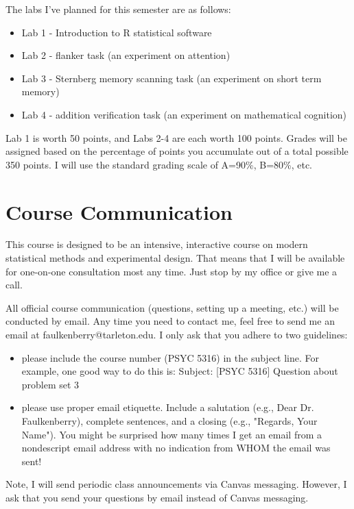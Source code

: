 \documentclass[10pt]{article}
\begin{document}
The labs I've planned for this semester are as follows:

\begin{itemize}
\item Lab 1 - Introduction to R statistical software
\item Lab 2 - flanker task (an experiment on attention)
\item Lab 3 - Sternberg memory scanning task (an experiment on short term memory)
\item Lab 4 - addition verification task (an experiment on mathematical cognition)
\end{itemize}

Lab 1 is worth 50 points, and Labs 2-4 are each worth 100 points. Grades will be assigned based on the percentage of points you accumulate out of a total possible 350 points.  I will use the standard grading scale of A=90\%, B=80\%, etc.

\section*{Course Communication}
\label{sec:org2854aac}

This course is designed to be an intensive, interactive course on modern statistical methods and experimental design.  That means that I will be available for one-on-one consultation most any time.  Just stop by my office or give me a call.

All official course communication (questions, setting up a meeting, etc.) will be conducted by email.  Any time you need to contact me, feel free to send me an email at faulkenberry@tarleton.edu.  I only ask that you adhere to two guidelines:
\begin{itemize}
\item please include the course number (PSYC 5316) in the subject line.  For example, one good way to do this is:  Subject: [PSYC 5316] Question about problem set 3
\item please use proper email etiquette.  Include a salutation (e.g., Dear Dr. Faulkenberry), complete sentences, and a closing (e.g., "Regards, Your Name").  You might be surprised how many times I get an email from a nondescript email address with no indication from WHOM the email was sent!
\end{itemize}

Note, I will send periodic class announcements via Canvas messaging. However, I ask that you send your questions by email instead of Canvas messaging. 
\end{document}
